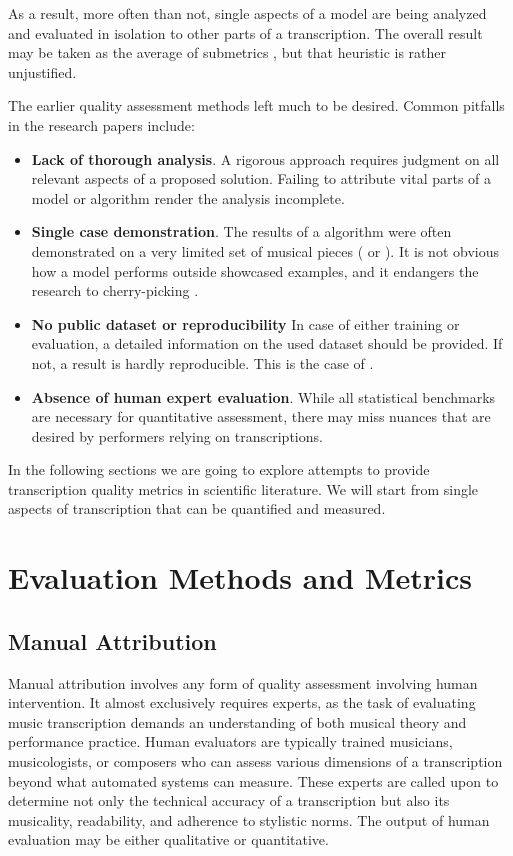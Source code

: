 As a result, more often than not, single aspects of a model are being analyzed and evaluated in isolation to other parts of a transcription. The overall result may be taken as the average of submetrics \missing, but that heuristic is rather unjustified.

The earlier quality assessment methods left much to be desired. Common pitfalls in the research papers include:\begin{itemize}
	\item {\bf Lack of thorough analysis}. A rigorous approach requires judgment on all relevant aspects of a proposed solution. Failing to attribute vital parts of a model or algorithm render the analysis incomplete.
	\item {\bf Single case demonstration}. The results of a algorithm were often demonstrated on a very limited set of musical pieces (\cite{Takeda2002} or \cite{Yang2005}). It is not obvious how a model performs outside showcased examples, and it endangers the research to cherry-picking \missing.
	\item {\bf No public dataset or reproducibility} In case of either training or evaluation, a detailed information on the used dataset should be provided. If not, a result is hardly reproducible. This is the case of \cite{Takeda2002}.
	\item {\bf Absence of human expert evaluation}. While all statistical benchmarks are necessary for quantitative assessment, there may miss nuances that are desired by performers relying on transcriptions.
\end{itemize}

In the following sections we are going to explore attempts to provide transcription quality metrics in scientific literature. We will start from single aspects of transcription that can be quantified and measured.

\section{Evaluation Methods and Metrics}

\subsection{Manual Attribution}

Manual attribution involves any form of quality assessment involving human intervention. It almost exclusively requires experts, as the task of evaluating music transcription demands an understanding of both musical theory and performance practice. Human evaluators are typically trained musicians, musicologists, or composers who can assess various dimensions of a transcription beyond what automated systems can measure. These experts are called upon to determine not only the technical accuracy of a transcription but also its musicality, readability, and adherence to stylistic norms. The output of human evaluation may be either qualitative or quantitative. 

